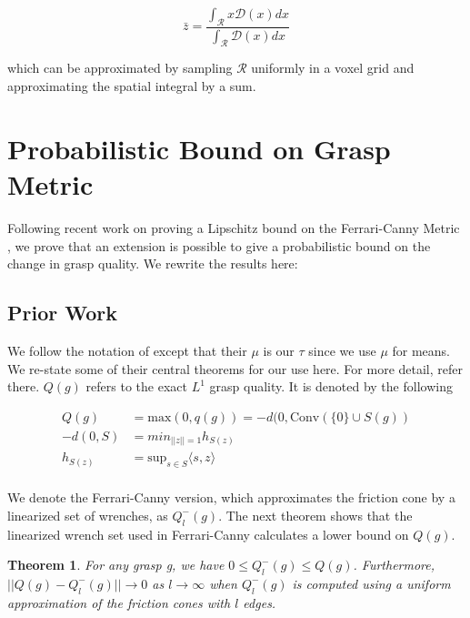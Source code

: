 \documentclass[letterpaper, 10 pt, conference]{ieeeconf}  %
\newtheorem{theorem}{Theorem}
\begin{document}
\begin{equation}
  \bar{z} 
  =
  \frac
    {\int_{\mathcal{R}}x \mathcal{D}(x) dx}
    {\int_{\mathcal{R}}  \mathcal{D}(x) dx}
\end{equation}

which can be approximated by sampling $\mathcal{R}$ uniformly in a voxel grid and approximating the spatial integral by a sum.


\section{Probabilistic Bound on Grasp Metric}
Following recent work on proving a Lipschitz bound on the Ferrari-Canny Metric \cite{pokorny2013classical}, we prove that an extension is possible to give a probabilistic bound on the change in grasp quality.
We rewrite the results here:

\subsection{Prior Work}

We follow the notation of \cite{pokorny2013classical} except that their $\mu$ is our $\tau$ since we use $\mu$ for means.  
We re-state some of their central theorems for our use here.
For more detail, refer there.
$Q(g)$ refers to the exact $L^1$ grasp quality.
It is denoted by the following 

\begin{align}
  Q(g) &= \mbox{max}(0,q(g)) = -d(0,\mbox{Conv}(\{0\} \cup S(g))\\
-d(0,S) &= min_{||z|| = 1} h_{S(z)}\\
h_{S(z)} &= \mbox{sup}_{s\in S}\langle s,z\rangle\\
\end{align}

We denote the Ferrari-Canny version, which approximates the friction cone by a linearized set of wrenches\cite{ferrari1992}, as $Q^-_l(g)$.
The next theorem shows that the linearized wrench set used in Ferrari-Canny calculates a lower bound on $Q(g)$.\\

\begin{theorem}
  \cite{pokorny2013classical}
For any grasp g, we have $0 \leq Q_l^-(g) \leq Q(g)$.
Furthermore, $||Q(g) - Q^-_l(g)|| \rightarrow 0$ as $l \rightarrow \infty$ when $Q_l^-(g)$ is computed using a uniform approximation of the friction cones with $l$ edges. \\
\end{theorem}
\end{document}

